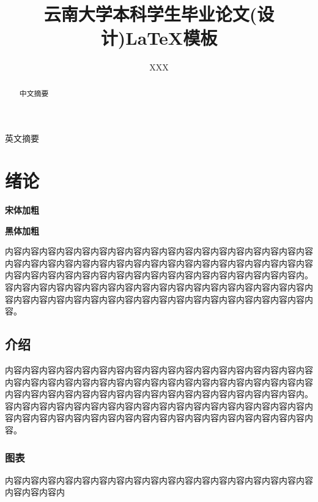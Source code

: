 \documentclass{YNUbachelor}
\title{云南大学本科学生毕业论文(设计)\;\LaTeX 模板}
\author{XXX}
\begin{document}
	
	\cover

	\copyrightpage
	
	\maketitle

	\toc

	\begin{abstract}
		中文摘要
	\end{abstract}


	\begin{enabstract}
		英文摘要
	\end{enabstract}

		
	\section{绪论}
		{\bfseries \songti 宋体加粗}
		
		{\bfseries \heiti 黑体加粗}
		
		内容内容内容内容内容内容内容内容内容内容内容内容内容内容内容内容内容内容内容内容内容内容内容内容内容内容内容内容内容内容内容内容内容内容内容内容内容内容内容内容内容内容内容内容内容内容内容内容内容内容内容内容内容内。容内容内容内容内容内容内容内容内容内容内容内容内容内容内容内容内容内容内容内容内容内容内容内容内容内容内容内容内容内容内容内容内容内容内容内容内容。
		
	\subsection{介绍}
		内容内容内容内容内容内容内容内容内容内容内容内容内容内容内容内容内容内容内容内容内容内容内容内容内容内容内容内容内容内容内容内容内容内容内容内容内容内容内容内容内容内容内容内容内容内容内容内容内容内容内容内容内容内。容内容内容内容内容内容内容内容内容内容内容内容内容内容内容内容内容内容内容内容内容内容内容内容内容内容内容内容内容内容内容内容内容内容内容内容内容。
		
	\subsubsection{图表}
		内容内容内容内容内容内容内容内容内容内容内容内容内容内容内容内容内容内容内容内容内容内
		
		
		
\end{document}
